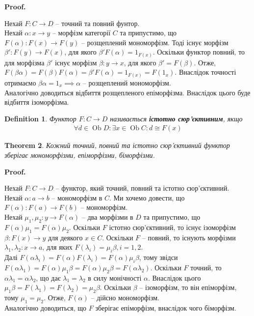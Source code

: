 \documentclass[a4paper, 10pt]{article}
\makeatletter
\theoremstyle{theoremdd}
\newtheorem{theorem}{Theorem}[subsection]
\newtheorem{definition}[theorem]{Definition}
\renewenvironment{proof}[1][Proof.\\]{\par
\pushQED{\hfill \qed}%
\normalfont \topsep6\p@\@plus6\p@\relax
\trivlist
\item\relax
{\bfseries
#1\@addpunct{.}}\hspace\labelsep\ignorespaces
}{%
\popQED\endtrivlist\@endpefalse
}
\DeclareMathOperator{\Ob}{Ob}
\makeatother
\begin{document}
\begin{proof}
Нехай $F \colon C \to D$ -- точний та повний фунтор. \\
Нехай $\alpha \colon x \to y$ -- морфізм категорії $C$ та припустимо, що $F(\alpha) \colon F(x) \to F(y)$ -- розщеплений мономорфізм. Тоді існує морфізм $\beta' \colon F(y) \to F(x)$, для якого $\beta' F(\alpha) = 1_{F(x)}$. Оскільки функтор повний, то для морфізма $\beta'$ існує морфізм $\beta \colon y \to x$, для якого $\beta' = F(\beta)$. Отже, $F(\beta \alpha) = F(\beta) F(\alpha) = \beta' F(\alpha) = 1_{F(x)} = F(1_x)$. Внаслідок точності отримаємо $\beta \alpha = 1_x \implies \alpha$ -- розщеплений мономорфізм.\\
Аналогічно доводиться відбиття розщепленого епіморфізма. Внаслідок цього буде відбиття ізоморфізма.
\end{proof}

\begin{definition}
Функтор $F \colon C \to D$ називається \textbf{істотно сюр'єктивним}, якщо
\begin{align*}
\forall d \in \Ob D: \exists x \in \Ob C: d \cong F(x)
\end{align*}
\end{definition}

\begin{theorem}
Кожний точний, повний та істотно сюр'єктивний функтор зберігає мономорфізми, епіморфізми, біморфізми.
\end{theorem}

\begin{proof}
Нехай $F \colon C \to D$ -- функтор, який точний, повний та істотно сюр'єктивний.\\
Нехай $\alpha \colon a \to b$ -- мономорфізм в $C$. Ми хочемо довести, що $F(\alpha) \colon F(a) \to F(b)$ -- мономорфізм.\\
Нехай $\mu_1,\mu_2 \colon y \to F(\alpha)$ -- два морфізми в $D$ та припустимо, що $F(\alpha) \mu_1 = F(\alpha) \mu_2$. Оскільки $F$ істотно сюр'єктивний, то існує ізоморфізм $\beta \colon F(x) \to y$  для деякого $x \in C$. Оскільки $F$ -- повний, то існують морфізми $\lambda_1,\lambda_2 \colon x \to a$, для яких $F(\lambda_i) = \mu_i \beta, i =1,2$.\\
Далі $F(\alpha \lambda_i) = F(\alpha) F(\lambda_i) = F(\alpha) \mu_i \beta$, тому звідси $F(\alpha \lambda_1) = F(\alpha) \mu_1 \beta = F(\alpha) \mu_2 \beta = F(\alpha \lambda_2)$. Оскільки $F$ точний, то $\alpha \lambda_1 = \alpha \lambda_2$, що дає $\lambda_1 = \lambda_2$ в силу монічності $\alpha$. Внаслідок цього $\mu_1 \beta = F(\lambda_1) = F(\lambda_2) = \mu_2 \beta$. Оскільки $\beta$ -- ізоморфізм, то він епіморфізм, тому $\mu_1 = \mu_2$. Отже, $F(\alpha)$ -- дійсно мономорфізм.\\
Аналогічно доводиться, що $F$ зберігає епіморфізм, внаслідок чого біморфізм.
\end{proof}
\end{document}
